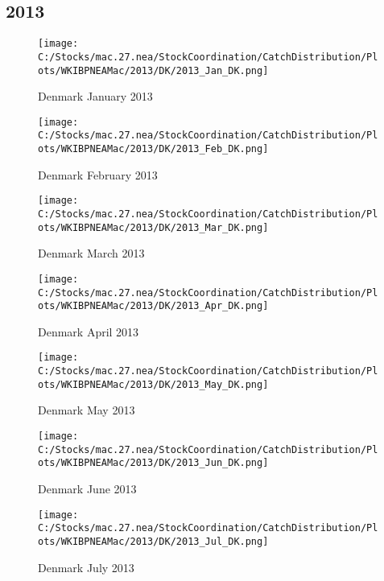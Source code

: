 \documentclass{article}
\begin{document}
\subsection{2013}



\begin{figure}[h]
	\centering
		\texttt{[image: C:/Stocks/mac.27.nea/StockCoordination/CatchDistribution/Plots/WKIBPNEAMac/2013/DK/2013\_Jan\_DK.png]}
	\caption{Denmark January 2013}
	\label{fig:2013_Jan_DK}
\end{figure}

\begin{figure}
	\centering
		\texttt{[image: C:/Stocks/mac.27.nea/StockCoordination/CatchDistribution/Plots/WKIBPNEAMac/2013/DK/2013\_Feb\_DK.png]}
	\caption{Denmark February 2013}
	\label{fig:2013_Feb_DK}
\end{figure}

\begin{figure}
	\centering
		\texttt{[image: C:/Stocks/mac.27.nea/StockCoordination/CatchDistribution/Plots/WKIBPNEAMac/2013/DK/2013\_Mar\_DK.png]}
	\caption{Denmark March 2013}
	\label{fig:2013_Mar_DK}
\end{figure}

\begin{figure}
	\centering
		\texttt{[image: C:/Stocks/mac.27.nea/StockCoordination/CatchDistribution/Plots/WKIBPNEAMac/2013/DK/2013\_Apr\_DK.png]}
	\caption{Denmark April 2013}
	\label{fig:2013_Apr_DK}
\end{figure}

\begin{figure}
	\centering
		\texttt{[image: C:/Stocks/mac.27.nea/StockCoordination/CatchDistribution/Plots/WKIBPNEAMac/2013/DK/2013\_May\_DK.png]}
	\caption{Denmark May 2013}
	\label{fig:2013_May_DK}
\end{figure}

\begin{figure}
	\centering
		\texttt{[image: C:/Stocks/mac.27.nea/StockCoordination/CatchDistribution/Plots/WKIBPNEAMac/2013/DK/2013\_Jun\_DK.png]}
	\caption{Denmark June 2013}
	\label{fig:2013_Jun_DK}
\end{figure}

\begin{figure}
	\centering
		\texttt{[image: C:/Stocks/mac.27.nea/StockCoordination/CatchDistribution/Plots/WKIBPNEAMac/2013/DK/2013\_Jul\_DK.png]}
	\caption{Denmark July 2013}
	\label{fig:2013_Jul_DK}
\end{figure}
\end{document}
